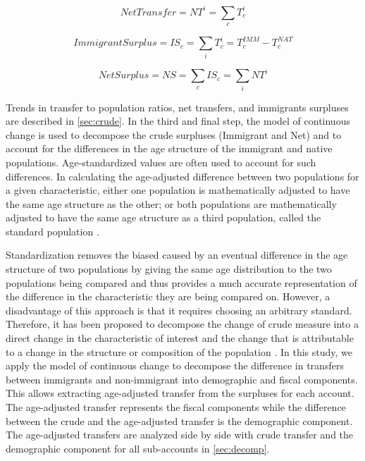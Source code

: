 \begin{equation}\label{eq:nt}
  Net Transfer=NT^{i}= \displaystyle\sum_{c}T^{i}_{c}
\end{equation}

\begin{equation}\label{eq:is}
  Immigrant Surplus=IS_{c}= \displaystyle\sum_{i}T^{i}_{c}=T^{IMM}_{c}-T^{NAT}_{c}
\end{equation}

\begin{equation}\label{eq:ns}
  Net Surplus = NS = \displaystyle\sum_{c}IS_{c} = \displaystyle\sum_{i}NT^{i}
\end{equation}

Trends in transfer to population ratios, net transfers, and immigrants surpluses are described in \autoref{sec:crude}.
In the third and final step, the model of continuous change \citep{Horiuchi:2008cn} is used to decompose the crude surpluses (Immigrant and Net) and to account for the differences in the age structure of the immigrant and native populations.
Age-standardized values are often used to account for such differences.
In calculating the age-adjusted difference between two populations for a given characteristic, either one population is mathematically adjusted to have the same age structure as the other; or both populations are mathematically adjusted to have the same age structure as a third population, called the standard population \citet{statCan:001}.

\vspace{0.7em}\par
Standardization removes the biased caused by an eventual difference in the age structure of two populations by giving the same age distribution to the two populations being compared and thus provides a much accurate representation of the difference in the characteristic they are being compared on.
However, a disadvantage of this approach is that it requires choosing an arbitrary standard.
Therefore, it has been proposed to decompose the change of crude measure into a direct change in the characteristic of interest and the change that is attributable to a change in the structure or composition of the population \citep{Prskawetz:2005dx}.
In this study, we apply the model of continuous change \citep{Horiuchi:2008cn} to decompose the difference in transfers between immigrants and non-immigrant into demographic and fiscal components.
This allows extracting age-adjusted transfer from the surpluses for each account.
The age-adjusted transfer represents the fiscal components while the difference between the crude and the age-adjusted transfer is the demographic component.
The age-adjusted transfers are analyzed side by side with crude transfer and the demographic component for all sub-accounts in \autoref{sec:decomp}.

